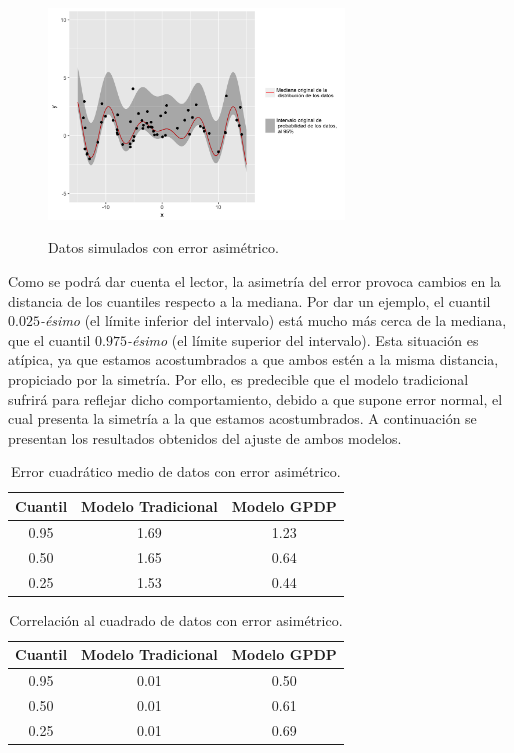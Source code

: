 \begin{figure}[H]
	\centering
	\caption{Datos simulados con error asim\'etrico.}
	\includegraphics[width=0.7\textwidth]{Figures/Simulation/asymmetric/sample.png}
	\label{sample_asymmetric}
\end{figure}

Como se podr\'a dar cuenta el lector, la asimetr\'ia del error provoca cambios en la distancia de los cuantiles respecto a la mediana. Por dar un ejemplo, el cuantil $0.025$\textit{-\'esimo} (el l\'imite inferior del intervalo) est\'a mucho m\'as cerca de la mediana, que el cuantil $0.975$\textit{-\'esimo} (el l\'imite superior del intervalo). Esta situaci\'on es at\'ipica, ya que estamos acostumbrados a que ambos est\'en a la misma distancia, propiciado por la simetr\'ia. Por ello, es predecible que el modelo tradicional sufrir\'a para reflejar dicho comportamiento, debido a que supone error normal, el cual presenta la simetr\'ia a la que estamos acostumbrados. A continuaci\'on se presentan los resultados obtenidos del ajuste de ambos modelos.

\begin{table}[H]
\centering
\caption{Error cuadrático medio de datos con error asimétrico.}
\begin{tabular}{ccc}
  \hline
Cuantil & Modelo Tradicional & Modelo GPDP \\ 
  \hline
0.95 & 1.69 & 1.23 \\ 
  0.50 & 1.65 & 0.64 \\ 
  0.25 & 1.53 & 0.44 \\ 
   \hline
\end{tabular}
\label{mse_asymmetric}
\end{table}

\begin{table}[H]
\centering
\caption{Correlación al cuadrado de datos con error asimétrico.}
\begin{tabular}{ccc}
  \hline
Cuantil & Modelo Tradicional & Modelo GPDP \\ 
  \hline
0.95 & 0.01 & 0.50 \\ 
  0.50 & 0.01 & 0.61 \\ 
  0.25 & 0.01 & 0.69 \\ 
   \hline
\end{tabular}
\label{corr_asymmetric}
\end{table}

